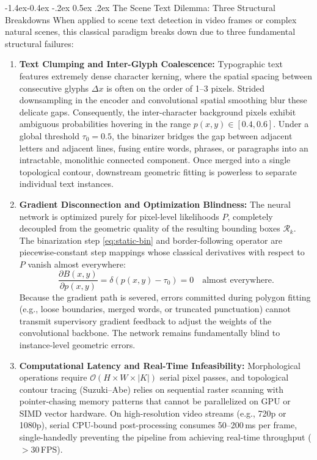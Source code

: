 \documentclass[11pt,a4paper]{article}
\makeatletter
\renewcommand\subsection{\@startsection{subsection}{2}{\z@}%
                                     {-1.4ex\@plus -0.4ex \@minus -.2ex}%
                                     {0.5ex \@plus .2ex}%
                                     {\normalfont\normalsize\bfseries}}
\newcommand{\1}{\mathbf{1}}
\makeatother
\begin{document}
\subsection{The Scene Text Dilemma: Three Structural Breakdowns}
When applied to scene text detection in video frames or complex natural scenes, this classical paradigm breaks down due to three fundamental structural failures:
\begin{enumerate}
    \item \textbf{Text Clumping and Inter-Glyph Coalescence:} Typographic text features extremely dense character kerning, where the spatial spacing between consecutive glyphs $\Delta x$ is often on the order of 1--3 pixels. Strided downsampling in the encoder and convolutional spatial smoothing blur these delicate gaps. Consequently, the inter-character background pixels exhibit ambiguous probabilities hovering in the range $p(x,y) \in [0.4, 0.6]$. Under a global threshold $\tau_0 = 0.5$, the binarizer bridges the gap between adjacent letters and adjacent lines, fusing entire words, phrases, or paragraphs into an intractable, monolithic connected component. Once merged into a single topological contour, downstream geometric fitting is powerless to separate individual text instances.
    \item \textbf{Gradient Disconnection and Optimization Blindness:} The neural network is optimized purely for pixel-level likelihoods $P$, completely decoupled from the geometric quality of the resulting bounding boxes $\mathcal{R}_k$. The binarization step \eqref{eq:static-bin} and border-following operator are piecewise-constant step mappings whose classical derivatives with respect to $P$ vanish almost everywhere:
    \begin{equation}
    \frac{\partial B(x,y)}{\partial p(x,y)} = \delta\!\left(p(x,y) - \tau_0\right) = 0 \quad \text{almost everywhere}.
    \label{eq:vanished-grad}
    \end{equation}
    Because the gradient path is severed, errors committed during polygon fitting (e.g., loose boundaries, merged words, or truncated punctuation) cannot transmit supervisory gradient feedback to adjust the weights of the convolutional backbone. The network remains fundamentally blind to instance-level geometric errors.
    \item \textbf{Computational Latency and Real-Time Infeasibility:} Morphological operations require $\mathcal{O}(H \times W \times |K|)$ serial pixel passes, and topological contour tracing (Suzuki--Abe) relies on sequential raster scanning with pointer-chasing memory patterns that cannot be parallelized on GPU or SIMD vector hardware. On high-resolution video streams (e.g., 720p or 1080p), serial CPU-bound post-processing consumes 50--200\,ms per frame, single-handedly preventing the pipeline from achieving real-time throughput ($>30$\,FPS).
\end{enumerate}
\end{document}
